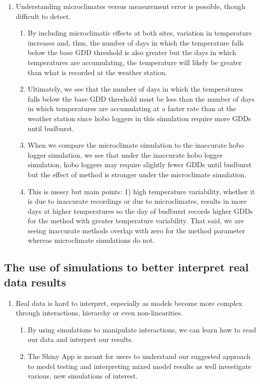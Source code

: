 \documentclass{article}\usepackage[]{graphicx}\usepackage[]{color}
\begin{document}
\begin{enumerate}
\item Understanding microclimates versus measurement error is possible, though difficult to detect. 
  \begin{enumerate}
  \item By including microclimatic effects at both sites, variation in temperature increases and, thus, the number of days in which the temperature falls below the base GDD threshold is also greater but the days in which temperatures are accumulating, the temperature will likely be greater than what is recorded at the weather station.
  \item Ultimately, we see that the number of days in which the temperatures falls below the base GDD threshold must be less than the number of days in which temperatures are accumulating at a faster rate than at the weather station since hobo loggers in this simulation require more GDDs until budburst.
  \item When we compare the microclimate simulation to the inaccurate hobo logger simulation, we see that under the inaccurate hobo logger simulation, hobo loggers may require slightly fewer GDDs until budburst but the effect of method is stronger under the microclimate simulation.
  \item This is messy but main points: 1) high temperature variability, whether it is due to inaccurate recordings or due to microclimates, results in more days at higher temperatures so the day of budburst records higher GDDs for the method with greater temperature variability. That said, we are seeing inaccurate methods overlap with zero for the method parameter whereas microclimate simulations do not.
  \end{enumerate}
\end{enumerate}


\subsection*{The use of simulations to better interpret real data results}
\begin{enumerate}
\item Real data is hard to interpret, especially as models become more complex through interactions, hierarchy or even non-linearities. 
  \begin{enumerate}
  \item By using simulations to manipulate interactions, we can learn how to read our data and interpret our results.
  \item The Shiny App is meant for users to understand our suggested approach to model testing and interpreting mixed model results as well investigate various, new simulations of interest. 
  \end{enumerate}
\end{enumerate}
\end{document}
